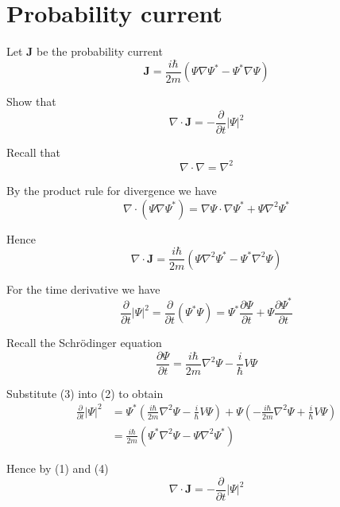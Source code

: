 

\section*{Probability current}

Let $\mathbf J$ be the probability current
\begin{equation*}
\mathbf J=\frac{i\hbar}{2m}\left(\Psi\nabla\Psi^*-\Psi^*\nabla\Psi\right)
\end{equation*}

Show that
\begin{equation*}
\nabla\cdot\mathbf J=-\frac{\partial}{\partial t}|\Psi|^2
\end{equation*}

Recall that
\begin{equation*}
\nabla\cdot\nabla=\nabla^2
\end{equation*}

By the product rule for divergence we have
\begin{equation*}
\nabla\cdot(\Psi\nabla\Psi^*)
=\nabla\Psi\cdot\nabla\Psi^*+\Psi\nabla^2\Psi^*
\end{equation*}

Hence
\begin{equation*}
\nabla\cdot\mathbf J
=\frac{i\hbar}{2m}\left(\Psi\nabla^2\Psi^*-\Psi^*\nabla^2\Psi\right)
\tag{1}
\end{equation*}

For the time derivative we have
\begin{equation*}
\frac{\partial}{\partial t}|\Psi|^2
=\frac{\partial}{\partial t}(\Psi^*\Psi)
=\Psi^*\frac{\partial\Psi}{\partial t}+\Psi\frac{\partial\Psi^*}{\partial t}
\tag{2}
\end{equation*}

Recall the Schr\"odinger equation
\begin{equation*}
\frac{\partial\Psi}{\partial t}
=\frac{i\hbar}{2m}\nabla^2\Psi-\frac{i}{\hbar}V\Psi
\tag{3}
\end{equation*}

Substitute (3) into (2) to obtain
\begin{align*}
\frac{\partial}{\partial t}|\Psi|^2
&=\Psi^*\left(\frac{i\hbar}{2m}\nabla^2\Psi-\frac{i}{\hbar}V\Psi\right)
+\Psi\left(-\frac{i\hbar}{2m}\nabla^2\Psi+\frac{i}{\hbar}V\Psi\right)
\\
&=\frac{i\hbar}{2m}\left(\Psi^*\nabla^2\Psi-\Psi\nabla^2\Psi^*\right)
\tag{4}
\end{align*}

Hence by (1) and (4)
\begin{equation*}
\nabla\cdot\mathbf J=-\frac{\partial}{\partial t}|\Psi|^2
\end{equation*}


